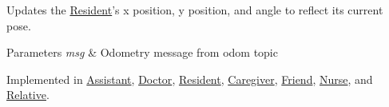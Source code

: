 Updates the \hyperlink{classResident}{Resident}'s x position, y position, and angle to reflect its current pose. 


\begin{DoxyParams}{Parameters}
{\em msg} & Odometry message from odom topic \\
\hline
\end{DoxyParams}


Implemented in \hyperlink{classAssistant_ad016061136f3fa5c3ed733e23a54aa00}{Assistant}, \hyperlink{classDoctor_a92b20f52198c6137d8858152cba77640}{Doctor}, \hyperlink{classResident_ae1406a27c978147c7816e57f9ed13aed}{Resident}, \hyperlink{classCaregiver_aa326466c62614b84d6a750dc0e59fa48}{Caregiver}, \hyperlink{classFriend_ab336b2a40bc6b9787bd0e9283f29f468}{Friend}, \hyperlink{classNurse_a3ff47edb35f171a538fe62b3abdca948}{Nurse}, and \hyperlink{classRelative_a13fc6c65f7338cfa29c9f31958134c56}{Relative}.



